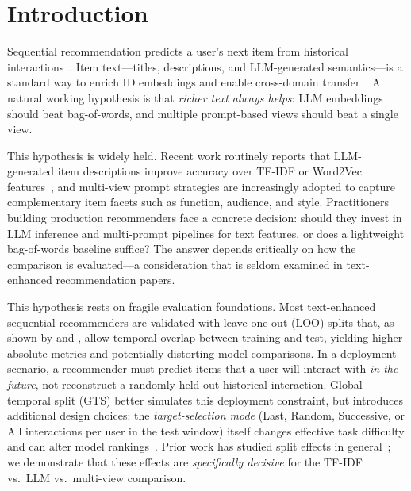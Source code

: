 \documentclass[sigconf,natbib=true,anonymous]{acmart}
\newcommand{\tfidf}{\textsc{TF-IDF}\xspace}
\newcommand{\llm}{\textsc{LLM}\xspace}
\begin{document}

\maketitle

\section{Introduction}
\label{sec:intro}

Sequential recommendation predicts a user's next item from historical interactions~\cite{kang2018sasrec,sun2019bert4rec,hidasi2016gru4rec}.
Item text---titles, descriptions, and LLM-generated semantics---is a standard way to enrich ID embeddings and enable cross-domain transfer~\cite{hou2022unisrec,bao2023tallrec}.
A natural working hypothesis is that \emph{richer text always helps}: LLM embeddings should beat bag-of-words, and multiple prompt-based views should beat a single view.

This hypothesis is widely held.
Recent work routinely reports that LLM-generated item descriptions improve accuracy over TF-IDF or Word2Vec features~\cite{hou2022unisrec,bao2023tallrec}, and multi-view prompt strategies are increasingly adopted to capture complementary item facets such as function, audience, and style.
Practitioners building production recommenders face a concrete decision: should they invest in LLM inference and multi-prompt pipelines for text features, or does a lightweight bag-of-words baseline suffice?
The answer depends critically on how the comparison is evaluated---a consideration that is seldom examined in text-enhanced recommendation papers.

This hypothesis rests on fragile evaluation foundations.
Most text-enhanced sequential recommenders are validated with leave-one-out (LOO) splits that, as shown by \citet{ji2023evaluation} and \citet{sun2023reevaluation}, allow temporal overlap between training and test, yielding higher absolute metrics and potentially distorting model comparisons.
In a deployment scenario, a recommender must predict items that a user will interact with \emph{in the future}, not reconstruct a randomly held-out historical interaction.
Global temporal split (GTS) better simulates this deployment constraint, but introduces additional design choices: the \emph{target-selection mode} (Last, Random, Successive, or All interactions per user in the test window) itself changes effective task difficulty and can alter model rankings~\cite{liang2024timetosplit}.
Prior work has studied split effects in general~\cite{meng2020temporal,ji2023evaluation}; we demonstrate that these effects are \emph{specifically decisive} for the \tfidf vs.\ \llm vs.\ multi-view comparison.
\end{document}
